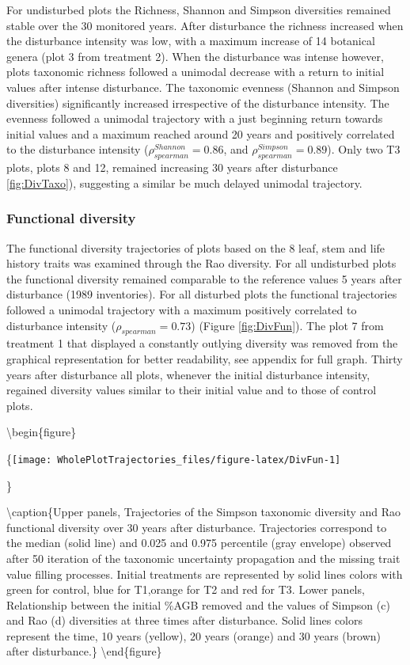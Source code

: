\documentclass[fleqn,10pt]{ArtEcoFoG} %
\theoremstyle{definition}
\theoremstyle{definition}
\theoremstyle{definition}
\theoremstyle{remark}
\begin{document}
For undisturbed plots the Richness, Shannon and Simpson diversities
remained stable over the 30 monitored years. After disturbance the
richness increased when the disturbance intensity was low, with a
maximum increase of 14 botanical genera (plot 3 from treatment 2). When
the disturbance was intense however, plots taxonomic richness followed a
unimodal decrease with a return to initial values after intense
disturbance. The taxonomic evenness (Shannon and Simpson diversities)
significantly increased irrespective of the disturbance intensity. The
evenness followed a unimodal trajectory with a just beginning return
towards initial values and a maximum reached around 20 years and
positively correlated to the disturbance intensity
(\(\rho_{spearman}^{Shannon}=0.86\), and
\(\rho_{spearman}^{Simpson}=0.89\)). Only two T3 plots, plots 8 and 12,
remained increasing 30 years after disturbance \ref{fig:DivTaxo}),
suggesting a similar be much delayed unimodal trajectory.

\subsubsection{Functional diversity}\label{functional-diversity}

The functional diversity trajectories of plots based on the 8 leaf, stem
and life history traits was examined through the Rao diversity. For all
undisturbed plots the functional diversity remained comparable to the
reference values 5 years after disturbance (1989 inventories). For all
disturbed plots the functional trajectories followed a unimodal
trajectory with a maximum positively correlated to disturbance intensity
(\(\rho_{spearman}=0.73\)) (Figure \ref{fig:DivFun}). The plot 7 from
treatment 1 that displayed a constantly outlying diversity was removed
from the graphical representation for better readability, see appendix
for full graph. Thirty years after disturbance all plots, whenever the
initial disturbance intensity, regained diversity values similar to
their initial value and to those of control plots.

\textbackslash{}begin\{figure\}

\{\centering \texttt{[image: WholePlotTrajectories\_files/figure-latex/DivFun-1]}

\}

\textbackslash{}caption\{Upper panels, Trajectories of the Simpson
taxonomic diversity and Rao functional diversity over 30 years after
disturbance. Trajectories correspond to the median (solid line) and
0.025 and 0.975 percentile (gray envelope) observed after 50 iteration
of the taxonomic uncertainty propagation and the missing trait value
filling processes. Initial treatments are represented by solid lines
colors with green for control, blue for T1,orange for T2 and red for T3.
Lower panels, Relationship between the initial \%AGB removed and the
values of Simpson (c) and Rao (d) diversities at three times after
disturbance. Solid lines colors represent the time, 10 years (yellow),
20 years (orange) and 30 years (brown) after
disturbance.\}\label{fig:DivFun} \textbackslash{}end\{figure\}
\end{document}
